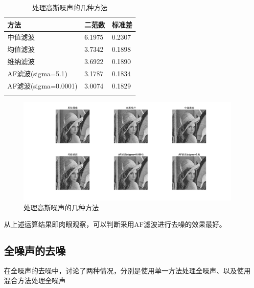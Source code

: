 \documentclass[a4paper,left=2.5cm,right=2.5cm]{article}
\begin{document}
\begin{spacing}{1.6}
		
		\begin{longtable}{lll}
			方法&二范数&标准差\\
			\hline
			中值滤波&6.1975& 0.2307\\
			均值滤波&3.7342&0.1898\\
			维纳滤波&3.6922&0.1890\\
			AF滤波(sigma=5.1)&3.1787&0.1834\\
			AF滤波(sigma=0.0001)&3.0074& 0.1829\\
			\hline
			\caption{处理高斯噪声的几种方法}
		\end{longtable}
		\begin{figure}[H]
			\includegraphics[width=\textwidth]{image/result_guass1.png}
			\caption{处理高斯噪声的几种方法}
		\end{figure}
		从上述运算结果即肉眼观察，可以判断采用AF滤波进行去噪的效果最好。
		\subsection{全噪声的去噪}
		在全噪声的去噪中，讨论了两种情况，分别是使用单一方法处理全噪声、以及使用混合方法处理全噪声
		

\end{spacing}
\end{document}
